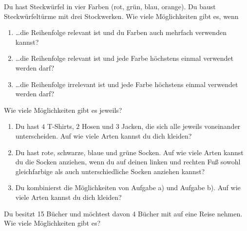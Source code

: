 \documentclass{cssheet}
\begin{document}
\begin{aufgabe}[WiSe 23/24]
	\begin{aufgabe}[SoSe 17, NT]
		Du hast Steckwürfel in vier Farben (rot, grün, blau, orange).
		Du baust Steckwürfeltürme mit drei Stockwerken. Wie viele Möglichkeiten gibt es, wenn
		\begin{enumerate}
			\item \dots die Reihenfolge relevant ist und du Farben auch mehrfach verwenden kannst?
			\item \dots die Reihenfolge relevant ist und jede Farbe höchstens einmal verwendet werden darf?
			\item \dots die Reihenfolge irrelevant ist und jede Farbe höchstens einmal verwendet werden darf?
		\end{enumerate}
	\end{aufgabe}
\end{aufgabe}

\begin{aufgabe}[SoSe 24]
	Wie viele Möglichkeiten gibt es jeweils?
	\begin{enumerate}
		\item Du hast $4$ T-Shirts, $2$ Hosen und $3$ Jacken, die sich alle jeweils voneinander unterscheiden. Auf wie viele Arten kannst du dich kleiden?
		\item Du hast rote, schwarze, blaue und grüne Socken. Auf wie viele Arten kannst du die Socken anziehen, wenn du auf deinen linken und rechten Fuß sowohl gleichfarbige als auch unterschiedliche Socken anziehen kannst?
		\item Du kombinierst die Möglichkeiten von Aufgabe a) und Aufgabe b). Auf wie viele Arten kannst du dich kleiden?
	\end{enumerate}
\end{aufgabe}

\begin{aufgabe}[WiSe 24/25]
	Du besitzt 15 Bücher und möchtest davon 4 Bücher mit auf eine Reise nehmen. Wie viele Möglichkeiten gibt es?
\end{aufgabe}


\vspace*{10mm}
\printlicense

\printsocials
\end{document}
